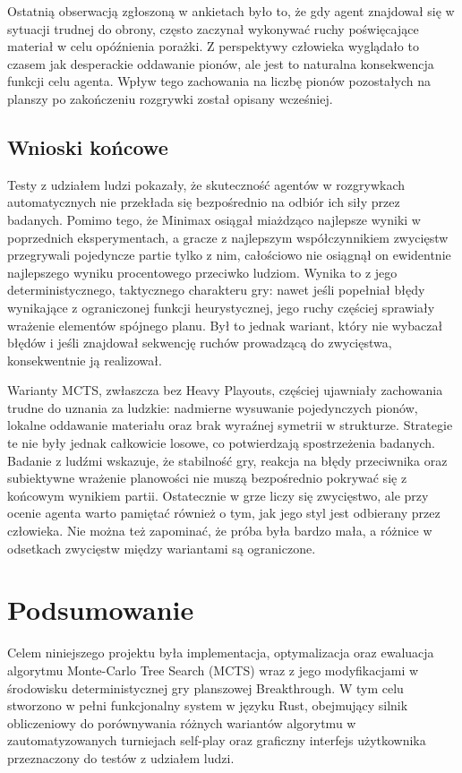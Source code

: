 \documentclass{article}
\begin{document}
Ostatnią obserwacją zgłoszoną w ankietach było to, że gdy agent znajdował się w sytuacji trudnej do obrony, często zaczynał wykonywać ruchy poświęcające materiał w celu opóźnienia porażki. Z perspektywy człowieka wyglądało to czasem jak desperackie oddawanie pionów, ale jest to naturalna konsekwencja funkcji celu agenta. Wpływ tego zachowania na liczbę pionów pozostałych na planszy po zakończeniu rozgrywki został opisany wcześniej.

\subsection{Wnioski końcowe}

Testy z udziałem ludzi pokazały, że skuteczność agentów w rozgrywkach automatycznych nie przekłada się bezpośrednio na odbiór ich siły przez badanych. Pomimo tego, że Minimax osiągał miażdząco najlepsze wyniki w poprzednich eksperymentach, a gracze z najlepszym współczynnikiem zwycięstw przegrywali pojedyncze partie tylko z nim, całościowo nie osiągnął on ewidentnie najlepszego wyniku procentowego przeciwko ludziom. Wynika to z jego deterministycznego, taktycznego charakteru gry: nawet jeśli popełniał błędy wynikające z ograniczonej funkcji heurystycznej, jego ruchy częściej sprawiały wrażenie elementów spójnego planu. Był to jednak wariant, który nie wybaczał błędów i jeśli znajdował sekwencję ruchów prowadzącą do zwycięstwa, konsekwentnie ją realizował.

Warianty MCTS, zwłaszcza bez Heavy Playouts, częściej ujawniały zachowania trudne do uznania za ludzkie: nadmierne wysuwanie pojedynczych pionów, lokalne oddawanie materiału oraz brak wyraźnej symetrii w strukturze. Strategie te nie były jednak całkowicie losowe, co potwierdzają spostrzeżenia badanych. Badanie z ludźmi wskazuje, że stabilność gry, reakcja na błędy przeciwnika oraz subiektywne wrażenie planowości nie muszą bezpośrednio pokrywać się z końcowym wynikiem partii. Ostatecznie w grze liczy się zwycięstwo, ale przy ocenie agenta warto pamiętać również o tym, jak jego styl jest odbierany przez człowieka. Nie można też zapominać, że próba była bardzo mała, a różnice w odsetkach zwycięstw między wariantami są ograniczone.

\newpage
\section{Podsumowanie}

Celem niniejszego projektu była implementacja, optymalizacja oraz ewaluacja algorytmu Monte-Carlo Tree Search (MCTS) wraz z jego modyfikacjami w środowisku deterministycznej gry planszowej Breakthrough. W tym celu stworzono w pełni funkcjonalny system w języku Rust, obejmujący silnik obliczeniowy do porównywania różnych wariantów algorytmu w zautomatyzowanych turniejach self-play oraz graficzny interfejs użytkownika przeznaczony do testów z udziałem ludzi.
\end{document}
